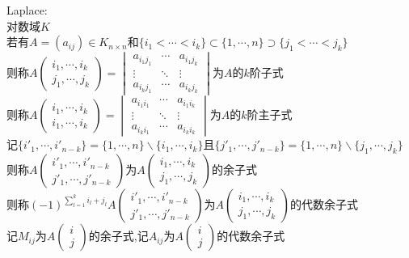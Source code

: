 \begin{dingli}
Laplace:\\
对数域$K$\\
若有$A=(a_{ij})\in K_{n\times n}$和$\{i_1<\cdots<i_k\}\subset\{1,\cdots,n\}\supset\{j_1<\cdots<j_k\}$\\
则称$A\begin{pmatrix}i_1,\cdots,i_k\\ j_1,\cdots,j_k\end{pmatrix}=\begin{vmatrix} a_{i_1j_1}& \cdots & a_{i_1j_k} \\ \vdots & \ddots & \vdots \\ a_{i_kj_1} & \cdots & a_{i_kj_k} \end{vmatrix}$为$A$的$k$阶子式\\
则称$A\begin{pmatrix}i_1,\cdots,i_k\\ i_1,\cdots,i_k\end{pmatrix}=\begin{vmatrix} a_{i_1i_1}& \cdots & a_{i_1i_k} \\ \vdots & \ddots & \vdots \\ a_{i_ki_1} & \cdots & a_{i_ki_k} \end{vmatrix}$为$A$的$k$阶主子式\\
记$\{i'_1,\cdots,i'_{n-k}\}=\{1,\cdots,n\}\backslash\{i_1,\cdots,i_k\}$且$\{j'_1,\cdots,j'_{n-k}\}=\{1,\cdots,n\}\backslash\{j_1,\cdots,j_k\}$\\
则称$A\begin{pmatrix}i'_1,\cdots,i'_{n-k}\\ j'_1,\cdots,j'_{n-k}\end{pmatrix}$为$A\begin{pmatrix}i_1,\cdots,i_k\\ j_1,\cdots,j_k\end{pmatrix}$的余子式\\
则称$(-1)^{\sum\limits_{l=1}^{k}i_l+j_l}A\begin{pmatrix}i'_1,\cdots,i'_{n-k}\\ j'_1,\cdots,j'_{n-k}\end{pmatrix}$为$A\begin{pmatrix}i_1,\cdots,i_k\\ j_1,\cdots,j_k\end{pmatrix}$的代数余子式\\
记$M_{ij}$为$A\begin{pmatrix}i \\ j\end{pmatrix}$的余子式,记$A_{ij}$为$A\begin{pmatrix}i \\ j\end{pmatrix}$的代数余子式\\

\end{dingli}
